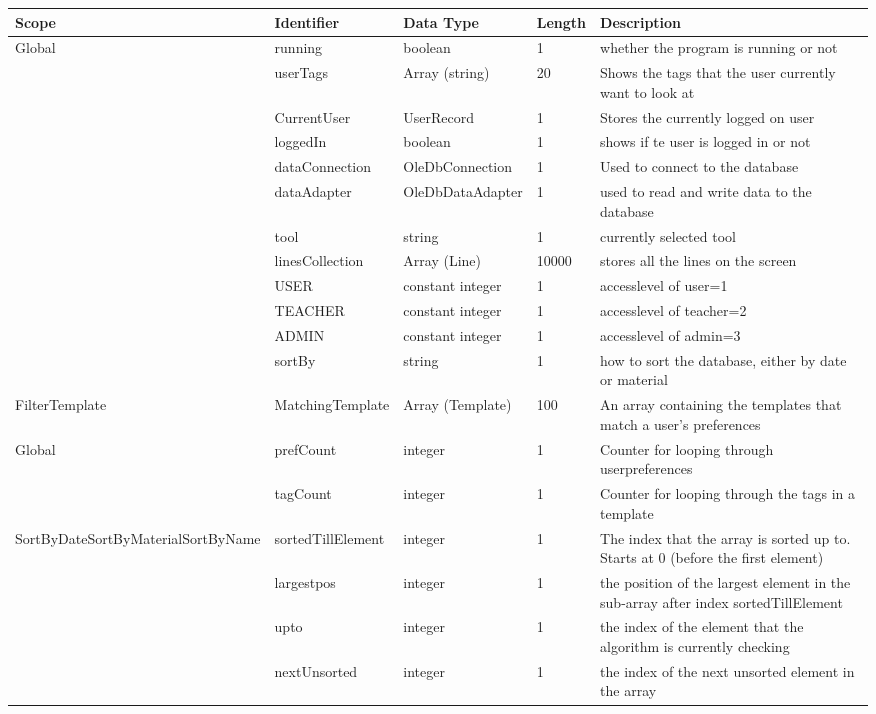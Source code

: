 \documentclass[oneside,openany,11pt,a4paper]{report}
\begin{document}


\begin{longtable}{|p{2cm}|p{3cm}|p{2cm}|p{1cm}|p{6cm}|}	
	
	\hline
	\rowcolor{gray!25}
	
	\small \textbf{Scope} & \small\textbf{Identifier}  & \small\textbf{Data Type} & \small\textbf{Length \footnotemark} & \small\textbf{Description} \\ \hline
	
	\multirow{12}{*}{\parbox{2cm}{Global}}
	& running & boolean & 1 & whether the program is running or not\\
	& userTags & Array (string) & 20 & Shows the tags that the user currently want to look at\\
	& CurrentUser & UserRecord & 1 & Stores the currently logged on user\\
	& loggedIn & boolean & 1 &shows if te user is logged in or not\\
	& dataConnection & OleDbConnection & 1 & Used to connect to the database\\
	& dataAdapter & OleDbDataAdapter & 1 & used to read and write data to the database\\
	& tool & string & 1 & currently selected tool\\
	& linesCollection & Array (Line) & 10000 & stores all the lines on the screen\\
	& USER & constant integer & 1 & accesslevel of user=1\\
	& TEACHER & constant integer & 1 & accesslevel of teacher=2\\
	& ADMIN & constant integer & 1 & accesslevel of admin=3\\
	& sortBy & string & 1 & how to sort the database, either by date or material \\ \hline
	
	FilterTemplate & MatchingTemplate & Array (Template) &100 & An array containing the templates that match a user's preferences \\ \hline
	
	\multirow{2}{*}{\parbox{2cm}{Global}}
	& prefCount & integer & 1 & Counter for looping through userpreferences\\
	& tagCount & integer &  1 & Counter for looping through the tags in a template\\ \hline
	\multirow{4}{*}{\parbox{2cm}{SortByDate\newline SortByMaterial\newline SortByName}}
		& sortedTillElement & integer & 1 & The index that the array is sorted up to. Starts at 0 (before the first element) \\
		& largestpos & integer & 1 & the position of the largest element in the sub-array after index sortedTillElement \\ 
		& upto & integer & 1 & the index of the element that the algorithm is currently checking \\
		& nextUnsorted & integer & 1 & the index of the next unsorted element in the array \\ \hline


\end{longtable}
\end{document}
